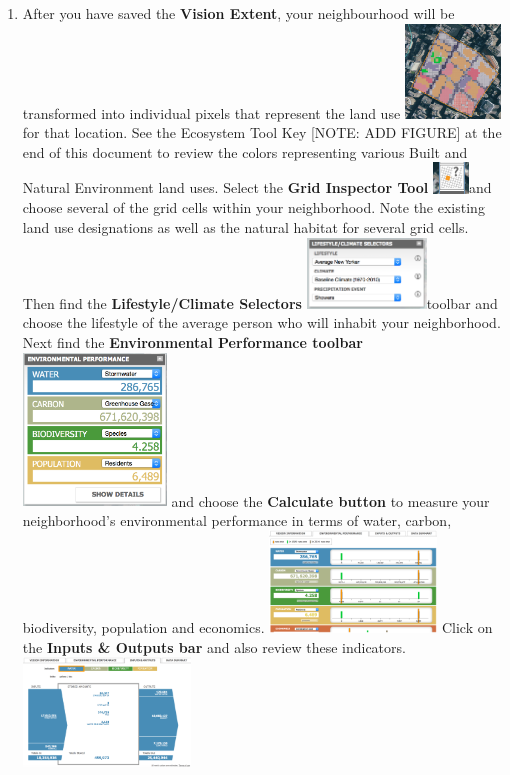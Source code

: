 \documentclass{article}
\begin{document}
\begin{enumerate}[leftmargin=15mm]
\item After you have saved the \textbf{Vision Extent}, your neighbourhood will be transformed into individual pixels that represent the land use \includegraphics[width=0.2\textwidth]{pixels.png} for that location.  See the Ecosystem Tool Key [NOTE: ADD FIGURE] at the end of this document to review the colors representing various Built and Natural Environment land uses.  Select the \textbf{Grid Inspector Tool} \includegraphics[width=0.075\textwidth]{grid_inspect.png}and choose several of the grid cells within your neighborhood.  Note the existing land use designations as well as the natural habitat for several grid cells.  Then find the \textbf{Lifestyle/Climate Selectors} \includegraphics[width=0.25\textwidth]{lifestyle.png}toolbar and choose the lifestyle of the average person who will inhabit your neighborhood.  Next find the \textbf{Environmental Performance toolbar} \includegraphics[width=0.3\textwidth]{env_perf.png} and choose the \textbf{Calculate button} to measure your neighborhood's environmental performance in terms of water, carbon, biodiversity, population and economics. \includegraphics[width=0.35\textwidth]{env_perf2.png}  Click on the \textbf{Inputs \& Outputs bar} and also review these indicators. \includegraphics[width=0.35\textwidth]{in_out.png}


\end{enumerate}
\end{document}
